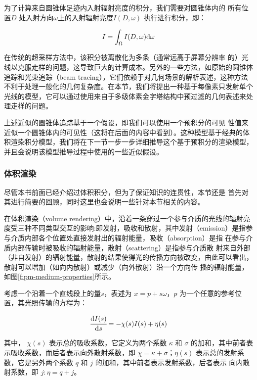 为了计算来自圆锥体足迹内入射辐射亮度的积分，我们需要对圆锥体内的 所有位置$D$ 处入射方向$\omega$上的入射辐射亮度$I(D,\omega)$ 执行进行积分，即：

\begin{equation}
	I=\int_{\Omega}I(D,\omega){\rm d}\omega
\end{equation}

在传统的超采样方法中，该积分被离散化为多条（通常远高于屏幕分辨率 的）光线以克服走样的问题，这导致巨大的计算成本。另外的一些方法，如原始的圆锥体追踪和光束追踪（beam tracing），它们依赖于对几何场景的解析表述，这种方法不利于处理一般化的几何复杂度。在本节，我们将提出一种基于每像素只发射单个光线的模型，它可以通过使用来自于多级体素金字塔结构中预过滤的几何表述来处理走样的问题。

上述近似的圆锥体追踪基于一个假设，即我们可以使用一个预积分的可见 性值来近似一个圆锥体内的可见性（这将在后面的内容中看到）。这种模型基于经典的体积渲染积分模型，我们将在下一节一步一步详细推导这个基于预积分的渲染模型，并且会说明该模型推导过程中使用的一些近似假设。




\subsubsection{体积渲染}
尽管本书前面已经介绍过体积积分，但为了保证知识的连贯性，本节还是 首先对其进行简要的回顾，同时这里也会说明一些针对本节相关的内容。

在体积渲染（volume rendering）中，沿着一条穿过一个参与介质的光线的辐射亮度受三种不同类型交互的影响:即发射，吸收和散射，其中发射（emission）是指参与介质内部各个位置处直接发射出的辐射能量，吸收（absorption）是指 在参与介质内部传输时被吸收的辐射能量，散射（scattering）是指参与介质散 射来自外部（非自发射）的辐射能量，散射的结果使得光的传播方向被改变，由此可以看出，散射可以增加（如向内散射）或减少（向外散射）沿一个方向传 播的辐射能量，如图\ref{f:pm-medium-properties}所示。

考虑一个沿着一个直线段上的量$s$，表述为 $x = p + s\omega$，$p$ 为一个任意的参考位置，其光照传输的方程为：

\begin{equation}
	\cfrac{{\rm d}I(s)}{{\rm d}s}=-\chi(s)I(s)+\eta(s)
\end{equation}

\noindent 其中， $\chi(s)$ 表示总的吸收系数，它定义为两个系数 $κ$ 和 $\sigma$ 的加和，其中前者表示吸收系数，而后者表示向外散射系数，即 $\chi = \kappa + \sigma$；$\eta(s)$ 表示总的发射系数，它是另外两个系数 $q$ 和 $j$ 的加和，其中前者表示发射系数，后者表示 向内散射系数，即 $j: \eta = q + j$。


